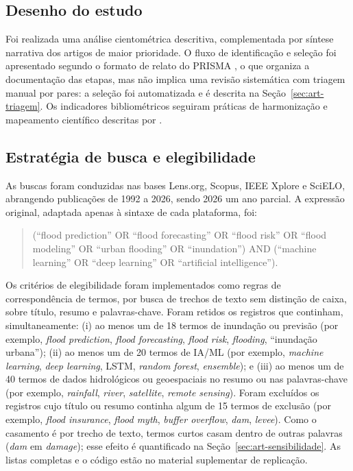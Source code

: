 \subsection{Desenho do estudo}

Foi realizada uma análise cientométrica descritiva, complementada por síntese narrativa dos artigos de maior prioridade. O fluxo de identificação e seleção foi apresentado segundo o formato de relato do PRISMA \cite{page2021}, o que organiza a documentação das etapas, mas não implica uma revisão sistemática com triagem manual por pares: a seleção foi automatizada e é descrita na Seção~\ref{sec:art-triagem}. Os indicadores bibliométricos seguiram práticas de harmonização e mapeamento científico descritas por .

\subsection{Estratégia de busca e elegibilidade}

As buscas foram conduzidas nas bases Lens.org, Scopus, IEEE Xplore e SciELO, abrangendo publicações de 1992 a 2026, sendo 2026 um ano parcial. A expressão original, adaptada apenas à sintaxe de cada plataforma, foi:

\begin{quote}\small
(``flood prediction'' OR ``flood forecasting'' OR ``flood risk'' OR ``flood modeling'' OR ``urban flooding'' OR ``inundation'') AND (``machine learning'' OR ``deep learning'' OR ``artificial intelligence'').
\end{quote}

Os critérios de elegibilidade foram implementados como regras de correspondência de termos, por busca de trechos de texto sem distinção de caixa, sobre título, resumo e palavras-chave. Foram retidos os registros que continham, simultaneamente: (i) ao menos um de 18 termos de inundação ou previsão (por exemplo, \textit{flood prediction}, \textit{flood forecasting}, \textit{flood risk}, \textit{flooding}, ``inundação urbana''); (ii) ao menos um de 20 termos de IA/ML (por exemplo, \textit{machine learning}, \textit{deep learning}, LSTM, \textit{random forest}, \textit{ensemble}); e (iii) ao menos um de 40 termos de dados hidrológicos ou geoespaciais no resumo ou nas palavras-chave (por exemplo, \textit{rainfall}, \textit{river}, \textit{satellite}, \textit{remote sensing}). Foram excluídos os registros cujo título ou resumo continha algum de 15 termos de exclusão (por exemplo, \textit{flood insurance}, \textit{flood myth}, \textit{buffer overflow}, \textit{dam}, \textit{levee}). Como o casamento é por trecho de texto, termos curtos casam dentro de outras palavras (\textit{dam} em \textit{damage}); esse efeito é quantificado na Seção~\ref{sec:art-sensibilidade}. As listas completas e o código estão no material suplementar de replicação.

